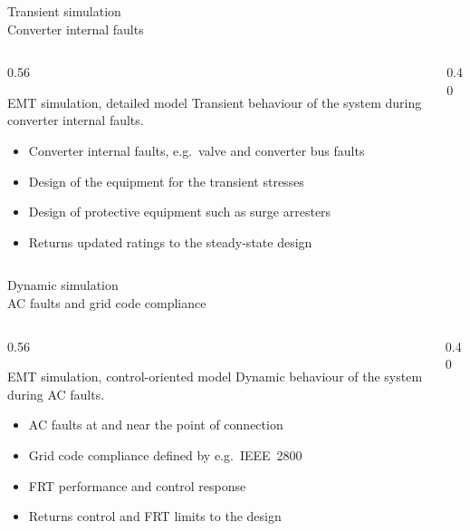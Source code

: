 \begin{frame}{Transient simulation\\Converter internal faults}
  \begin{columns}[T,onlytextwidth]
    \begin{column}{0.56\textwidth}
      \begin{block}{EMT simulation, detailed model}
        Transient behaviour of the system during converter internal faults.
      \end{block}
      \begin{itemize}
        \setlength{\itemsep}{0.4em}
        \item Converter internal faults, e.g.\ valve and converter bus faults
        \item Design of the equipment for the transient stresses
        \item Design of protective equipment such as surge arresters
        \item Returns updated ratings to the steady-state design
      \end{itemize}
    \end{column}
    \begin{column}{0.40\textwidth}
    \end{column}
  \end{columns}
\end{frame}

\begin{frame}{Dynamic simulation\\AC faults and grid code compliance}
  \begin{columns}[T,onlytextwidth]
    \begin{column}{0.56\textwidth}
      \begin{block}{EMT simulation, control-oriented model}
        Dynamic behaviour of the system during AC faults.
      \end{block}
      \begin{itemize}
        \setlength{\itemsep}{0.4em}
        \item AC faults at and near the point of connection
        \item Grid code compliance defined by e.g.\ IEEE~2800
        \item FRT performance and control response
        \item Returns control and FRT limits to the design
      \end{itemize}
    \end{column}
    \begin{column}{0.40\textwidth}
    \end{column}
  \end{columns}
\end{frame}


